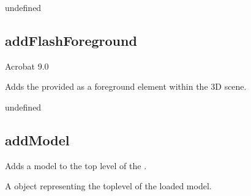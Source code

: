 \documentclass[letterpaper,12pt,english,openany,oneside]{sphinxmanual}
\begin{document}
\label{\detokenize{JS_3D_API:section-103}}\label{\detokenize{JS_3D_API:returns-101}}

undefined


\subsection{addFlashForeground}
\label{\detokenize{JS_3D_API:addflashforeground}}
Acrobat 9.0

Adds the provided  as a foreground element within the 3D scene.

\label{\detokenize{JS_3D_API:syntax-101}}

\begin{sphinxVerbatim}[commandchars=\\\{\}]
\end{sphinxVerbatim}
\label{\detokenize{JS_3D_API:parameters-75}}

\label{\detokenize{JS_3D_API:section-104}}\label{\detokenize{JS_3D_API:returns-102}}

undefined


\subsection{addModel}
\label{\detokenize{JS_3D_API:addmodel}}
Adds a model  to the top level of the .

\label{\detokenize{JS_3D_API:syntax-102}}

\begin{sphinxVerbatim}[commandchars=\\\{\}]
\end{sphinxVerbatim}
\label{\detokenize{JS_3D_API:parameters-76}}

\label{\detokenize{JS_3D_API:section-105}}\label{\detokenize{JS_3D_API:returns-103}}

A  object representing the top\sphinxhyphen{}level  of the loaded model.
\end{document}
